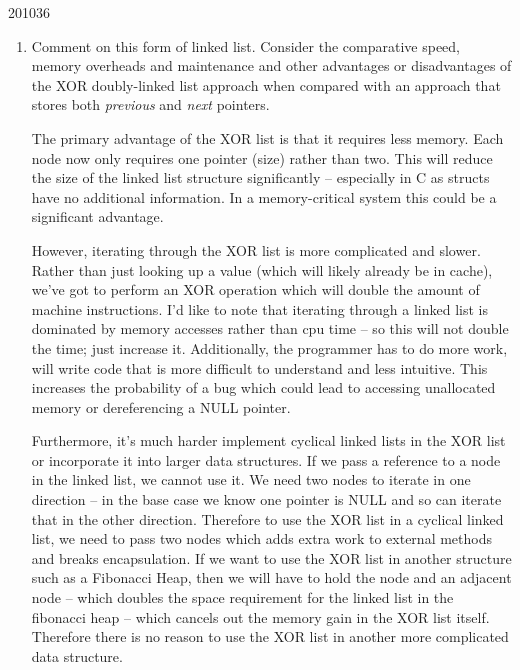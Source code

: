 \documentclass[10pt,\jkfside,a4paper]{article}
\begin{document}
\begin{examquestion}{2010}{3}{6}
\begin{enumerate}[label=(\alph*)]
\item Comment on this form of linked list. Consider the comparative speed,
memory overheads and maintenance and other advantages or disadvantages of
the XOR doubly-linked list approach when compared with an approach that
stores both \textit{previous} and \textit{next} pointers.

The primary advantage of the XOR list is that it requires less memory. Each
node now only requires one pointer (size) rather than two. This will reduce
the size of the linked list structure significantly -- especially in C as
structs have no additional information. In a memory-critical system this
could be a significant advantage.

However, iterating through the XOR list is more complicated and slower.
Rather than just looking up a value (which will likely already be in cache),
we've got to perform an XOR operation which will double the amount of
machine instructions. I'd like to note that iterating through a linked list
is dominated by memory accesses rather than cpu time -- so this will not
double the time; just increase it. Additionally, the programmer has to do
more work, will write code that is more difficult to understand and less
intuitive. This increases the probability of a bug which could lead to
accessing unallocated memory or dereferencing a NULL pointer.

Furthermore, it's much harder implement cyclical linked lists in the XOR list
or incorporate it into larger data structures. If we pass a reference to a
node in the linked list, we cannot use it. We need two nodes to iterate in
one direction -- in the base case we know one pointer is NULL and so can
iterate that in the other direction. Therefore to use the XOR list in a
cyclical linked list, we need to pass two nodes which adds extra work to
external methods and breaks encapsulation. If we want to use the XOR list
in another structure such as a Fibonacci Heap, then we will have to hold
the node and an adjacent node -- which doubles the space requirement for
the linked list in the fibonacci heap -- which cancels out the memory gain
in the XOR list itself. Therefore there is no reason to use the XOR list in
another more complicated data structure.

\end{enumerate}

\end{examquestion}
\end{document}
